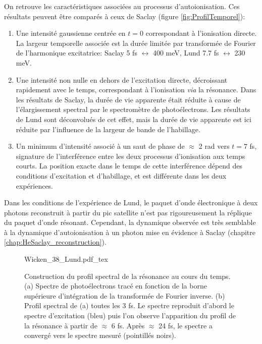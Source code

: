 On retrouve les caractéristiques associées au processus d'autoionisation. Ces résultats peuvent être comparés à ceux de Saclay (figure \ref{fig:ProfilTemporel}):
\begin{enumerate}[label=\textbullet]
\item Une intensité gaussienne centrée en $t = 0$ correspondant à l'ionisation directe. La largeur temporelle associée est la durée limitée par transformée de Fourier de l'harmonique excitatrice: Saclay 5 fs $\leftrightarrow$ 400 meV, Lund 7.7 fs $\leftrightarrow$ 230 meV.
\item Une intensité non nulle en dehors de l'excitation directe, décroissant rapidement avec le temps, correspondant à l'ionisation \textit{via} la résonance. Dans les résultats de Saclay, la durée de vie apparente était réduite à cause de l'élargissement spectral par le spectromètre de photoélectrons. Les résultats de Lund sont déconvolués de cet effet, mais la durée de vie apparente est ici réduite par l'influence de la largeur de bande de l'habillage.
\item Un minimum d'intensité associé à un saut de phase de $\approx$ 2 rad vers $t = 7$ fs, signature de l'interférence entre les deux processus d'ionisation aux temps courts. La position exacte dans le temps de cette interférence dépend des conditions d'excitation et d'habillage, et est différente dans les deux expériences. 
\end{enumerate}
Dans les conditions de l'expérience de Lund, le paquet d'onde électronique à deux photons reconstruit à partir du pic satellite n'est pas rigoureusement la réplique du paquet d'onde résonant. Cependant, la dynamique observée est très semblable à la dynamique d'autoionisation à un photon mise en évidence à Saclay (chapitre \ref{chap:HeSaclay_reconstruction}).

\begin{figure}[h]
\centering
\def\svgwidth{\textwidth}
{Wicken_38_Lund.pdf_tex}
\caption{Construction du profil spectral de la résonance au cours du temps. (a) Spectre de photoélectrons tracé en fonction de la borne supérieure d'intégration de la transformée de Fourier inverse. (b) Profil spectral de (a) toutes les 3 fs. Le spectre reproduit d'abord le spectre d'excitation (bleu) puis l'on observe l'apparition du profil de la résonance à partir de $\approx$ 6 fs. Après $\approx$ 24 fs, le spectre a convergé vers le spectre mesuré (pointillés noirs).}
\label{fig:Wicken_38_Lund}
\end{figure}

